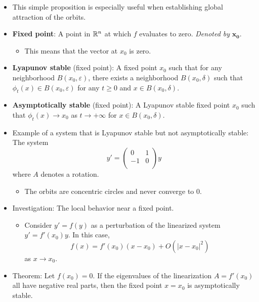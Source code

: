 \documentclass[../notes.tex]{subfiles}
\begin{document}
\begin{itemize}
\begin{proof}[Proof idea]
    \end{proof}
    \item This simple proposition is especially useful when establishing global attraction of the orbits.
    \item \textbf{Fixed point}: A point in $\mathbb{R}^n$ at which $f$ evaluates to zero. \emph{Denoted by} $\bm{x_0}$.
    \begin{itemize}
        \item This means that the vector at $x_0$ is zero.
    \end{itemize}
    \item \textbf{Lyapunov stable} (fixed point): A fixed point $x_0$ such that for any neighborhood $B(x_0,\varepsilon)$, there exists a neighborhood $B(x_0,\delta)$ such that $\phi_t(x)\in B(x_0,\varepsilon)$ for any $t\geq 0$ and $x\in B(x_0,\delta)$.
    \item \textbf{Asymptotically stable} (fixed point): A Lyapunov stable fixed point $x_0$ such that $\phi_t(x)\to x_0$ as $t\to+\infty$ for $x\in B(x_0,\delta)$.
    \item Example of a system that is Lyapunov stable but not asymptotically stable: The system
    \begin{equation*}
        y' =
        \begin{pmatrix}
            0 & 1\\
            -1 & 0\\
        \end{pmatrix}
        y
    \end{equation*}
    where $A$ denotes a rotation.
    \begin{itemize}
        \item The orbits are concentric circles and never converge to 0.
    \end{itemize}
    \item Investigation: The local behavior near a fixed point.
    \begin{itemize}
        \item Consider $y'=f(y)$ as a perturbation of the linearized system $y'=f'(x_0)y$. In this case,
        \begin{equation*}
            f(x) = f'(x_0)(x-x_0)+O(|x-x_0|^2)
        \end{equation*}
        as $x\to x_0$.
    \end{itemize}
    \item Theorem: Let $f(x_0)=0$. If the eigenvalues of the linearization $A=f'(x_0)$ all have negative real parts, then the fixed point $x=x_0$ is asymptotically stable.

\end{itemize}
\end{document}
